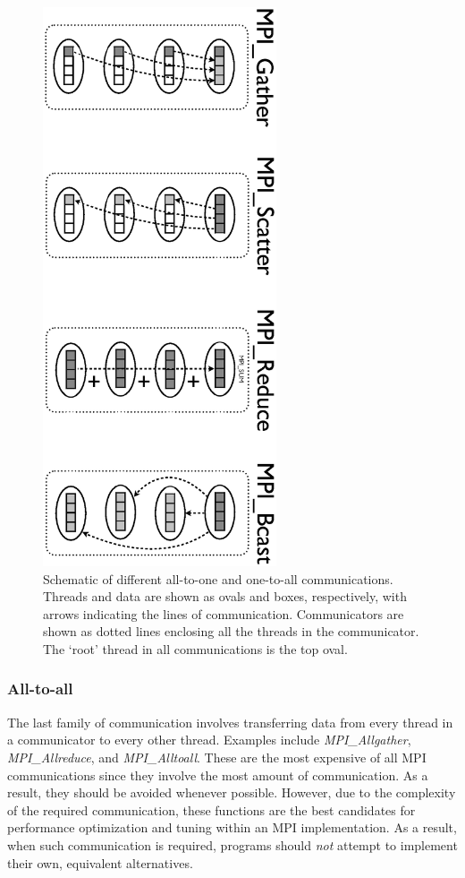 \begin{figure}
   \includegraphics[height=6.5in, angle=90, trim=7.5cm 0cm 0cm 0cm, clip=true]
         {AllToPoint.ps}
   \caption{Schematic of different all-to-one and one-to-all communications.
            Threads and data are shown as ovals and boxes, respectively, with
            arrows indicating the lines of communication. Communicators are
            shown as dotted lines enclosing all the threads in the communicator.
            The `root' thread in all communications is the top oval.}
   \label{figC:AllToPoint}
\end{figure}

\subsubsection{All-to-all}

The last family of communication involves transferring data from every thread in
a communicator to every other thread. Examples include \emph{MPI\_Allgather},
\emph{MPI\_Allreduce}, and \emph{MPI\_Alltoall}. These are the most expensive of
all MPI communications since they involve the most amount of communication. As a
result, they should be avoided whenever possible. However, due to the complexity
of the required communication, these functions are the best candidates for
performance optimization and tuning within an MPI implementation. As a result,
when such communication is required, programs should \emph{not} attempt to
implement their own, equivalent alternatives.

